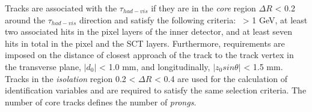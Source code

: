 Tracks are associated with the $\tau_{had-vis}$ if they are
in the \textit{core} region $\Delta R$ < 0.2 
around the $\tau_{had-vis}$ direction and 
satisfy the following criteria: \pt\ > 1 GeV, 
at least two associated hits in the pixel layers of the inner detector, 
and at least seven hits in total in the pixel and the SCT layers. 
Furthermore, requirements are imposed on 
the distance of closest approach of the track to the track vertex
in the transverse plane, $|d_0|$ < 1.0 mm, and
longitudinally, $|z_0 sin\theta|$ < 1.5 mm. 
Tracks in the \textit{isolation} region 0.2 < $\Delta R$ < 0.4 
are used for the calculation of identification variables 
and are required to satisfy the same selection criteria.
The number of core tracks defines the number of \textit{prongs}.

